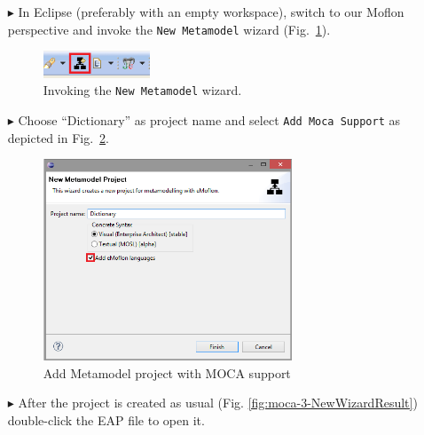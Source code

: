 \begin{enumerate}
\item[$\blacktriangleright$] In Eclipse (preferably with an empty workspace), switch to our Moflon perspective and invoke the \texttt{New Metamodel} wizard (Fig.~\ref{fig:moca-1-NewMetamodelWizard}). 

\begin{figure}[!htbp]
\begin{center}
 \includegraphics[width=0.3\textwidth]{pics/moca/1DictionaryMetaModel/1-NewMetamodelWizard}
  \caption{Invoking the \texttt{New Metamodel} wizard.}
  \label{fig:moca-1-NewMetamodelWizard}
\end{center}
\end{figure}

\item[$\blacktriangleright$] Choose ``Dictionary'' as project name and select \texttt{Add Moca Support} as depicted in Fig.~\ref{fig:moca-2-AddMocaSupport-ProjectName}. 

\begin{figure}[!htbp]
\begin{center}
 \includegraphics[width=0.7\textwidth]{pics/moca/1DictionaryMetaModel/2-AddMocaSupport-ProjectName}
  \caption{Add Metamodel project with MOCA support}
  \label{fig:moca-2-AddMocaSupport-ProjectName}
\end{center}
\end{figure}

\item[$\blacktriangleright$] After the project is created as usual (Fig. \ref{fig:moca-3-NewWizardResult}) double-click the EAP file to open it. 


\end{enumerate}
